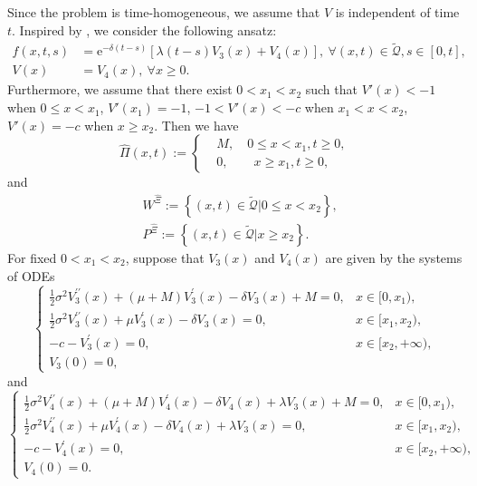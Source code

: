 \documentclass[11pt,reqno]{article}%
\numberwithin{equation}{section}
\begin{document}
Since the problem is time-homogeneous, we assume that $V$ is independent of time $t$. Inspired by \citet{ZHAO20141}, we consider the following ansatz:
\begin{equation}\begin{aligned}\label{fv2}
	f(x,t,s)&= \mathrm{e}^{-\delta (t-s)}\left[\lambda(t-s)V_3(x)+V_4(x)\right],\  \forall (x,t)\in\mathcal{\tilde{Q}}, s\in[0,t],\\
	V(x)&=V_4(x),\ \forall x\ge 0.\end{aligned}\end{equation}
Furthermore, we assume that there exist $0 < x_1 < x_2$ such that $V'(x) < -1$ when $0\le x < x_1$, $V'(x_1)=-1$, $-1 < V'(x) < -c$ when $x_1 < x < x_2$, $V'(x) =-c$ when $x\ge x_2$. Then we have
\begin{equation}\label{hatpi2}
\hat \Pi(x,t) := \left\{\begin{aligned}
& M,\quad  0 \le x < x_1, t\ge0,\\
& 0, \qquad x \geq x_1, t\ge 0,
\end{aligned}\right.
\end{equation}
and
\begin{equation}
\begin{aligned}
&W^{\hat{\Xi}}:=\left\{(x,t)\in\mathcal{\tilde{Q}}|0\leq x< x_2\right\},\\
&P^{\hat{\Xi}}:=\left\{(x,t)\in\mathcal{\tilde{Q}}|x\ge x_2\right\}.
\end{aligned}\label{hatxi2}
\end{equation}
For fixed $0 < x_1 < x_2$, suppose that $V_3(x)$ and $V_4(x)$ are given by the systems of ODEs
\begin{equation}\label{eq:V3_ODE}
\begin{cases}
\frac{1}{2} \sigma^2 V^{\prime\prime}_3(x) + (\mu + M) V^\prime_3(x) - \delta V_3(x) +M = 0, & x \in [0, x_1),\\
\frac{1}{2} \sigma^2 V^{\prime\prime}_3(x) + \mu V^\prime_3(x) - \delta V_3(x) = 0, \qquad & x \in [x_1, x_2),\\
-c- V^\prime_3(x) = 0, & x \in [x_2, +\infty),\\
V_3(0)=0,
\end{cases}
\end{equation}
and
\begin{equation}\label{eq:V4_ODE}
\begin{cases}
\frac{1}{2} \sigma^2 V^{\prime\prime}_4(x) + (\mu + M) V^\prime_4(x) - \delta V_4(x) +\lambda V_3(x)+M = 0, & x \in [0, x_1),\\
\frac{1}{2} \sigma^2 V^{\prime\prime}_4(x) + \mu V^\prime_4(x) - \delta V_4(x)+\lambda V_3(x) = 0, \qquad & x \in [x_1, x_2),\\
-c- V^\prime_4(x) = 0, & x \in [x_2, +\infty),\\
V_4(0)=0.
\end{cases}
\end{equation}
\end{document}
